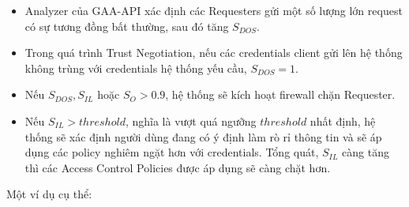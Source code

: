 \documentclass[12pt]{article}
\begin{document}
\begin{itemize}
\item Analyzer của GAA-API xác định các Requesters gửi một số lượng lớn request có sự tương đồng bất thường, sau đó tăng $S_{DOS}$.
\item Trong quá trình Trust Negotiation, nếu các credentials client gửi lên hệ thống không trùng với credentials hệ thống yếu cầu, $S_{DOS} = 1$.
\item Nếu $S_{DOS}, S_{IL}$ hoặc $S_O > 0.9$, hệ thống sẽ kích hoạt firewall chặn Requester.
\item Nếu $S_{IL} > threshold$, nghĩa là vượt quá ngưỡng $threshold$ nhất định, hệ thống sẽ xác định người dùng đang có ý định làm rò rỉ thông tin và sẽ áp dụng các policy nghiêm ngặt hơn với credentials. Tổng quát, $S_{IL}$ càng tăng thì các Access Control Policies được áp dụng sẽ càng chặt hơn.
\end{itemize}

Một ví dụ cụ thể:
\end{document}
